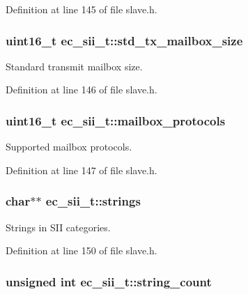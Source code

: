 Definition at line 145 of file slave.\-h.

\subsubsection[{std\-\_\-tx\-\_\-mailbox\-\_\-size}]{\setlength{\rightskip}{0pt plus 5cm}uint16\-\_\-t ec\-\_\-sii\-\_\-t\-::std\-\_\-tx\-\_\-mailbox\-\_\-size}\label{structec__sii__t_a47eb676cee305c53f5fec378bc95c68d}


Standard transmit mailbox size. 



Definition at line 146 of file slave.\-h.

\subsubsection[{mailbox\-\_\-protocols}]{\setlength{\rightskip}{0pt plus 5cm}uint16\-\_\-t ec\-\_\-sii\-\_\-t\-::mailbox\-\_\-protocols}\label{structec__sii__t_a7740732efd267741b956b8912502d8a1}


Supported mailbox protocols. 



Definition at line 147 of file slave.\-h.

\subsubsection[{strings}]{\setlength{\rightskip}{0pt plus 5cm}char$\ast$$\ast$ ec\-\_\-sii\-\_\-t\-::strings}\label{structec__sii__t_a74ade311e8937d005c486a1a68cd8744}


Strings in S\-I\-I categories. 



Definition at line 150 of file slave.\-h.

\subsubsection[{string\-\_\-count}]{\setlength{\rightskip}{0pt plus 5cm}unsigned int ec\-\_\-sii\-\_\-t\-::string\-\_\-count}\label{structec__sii__t_a4bfc0157c4dfaad31b7330aa5f515c5a}


